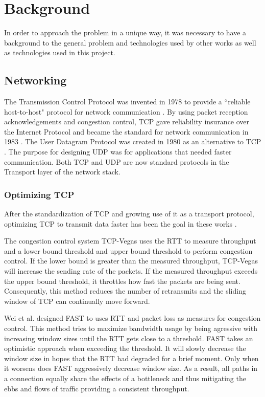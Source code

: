 \chapter{Background}

In order to approach the problem in a unique way, it was necessary to have a background to the general problem and technologies used by other works as well as technologies used in this project.

\section{Networking}

The Transmission Control Protocol was invented in 1978 to provide a ``reliable host-to-host" protocol for network communication \cite{cerf1978specification}. By using packet reception acknowledgements and congestion control, TCP gave reliability insurance over the Internet Protocol and became the standard for network communication in 1983 \cite{andrews2013who}. The User Datagram Protocol was created in 1980 as an alternative to TCP \cite{postel1980user}\cite{kozierokr2005udp}. The purpose for designing UDP was for applications that needed faster communication. Both TCP and UDP are now standard protocols in the Transport layer of the network stack.

\subsection{Optimizing TCP}

After the standardization of TCP and growing use of it as a transport protocol, optimizing TCP to transmit data faster has been the goal in these works \cite{brakmo1995tcp}\cite{wei2006fast}\cite{ha2008cubic}. 

The congestion control system TCP-Vegas \cite{brakmo1995tcp} uses the RTT to measure throughput and a lower bound threshold and upper bound threshold to perform congestion control. If the lower bound is greater than the measured throughput, TCP-Vegas will increase the sending rate of the packets. If the measured throughput exceeds the upper bound threshold, it throttles how fast the packets are being sent. Consequently, this method reduces the number of retransmits and the sliding window of TCP can continually move forward.

Wei et al. designed FAST to uses RTT and packet loss as measures for congestion control. This method tries to maximize bandwidth usage by being agressive with increasing window sizes until the RTT gets close to a threshold. FAST takes an optimistic approach when exceeding the threshold. It will slowly decrease the window size in hopes that the RTT had degraded for a brief moment. Only when it worsens does FAST aggressively decrease window size. As a result, all paths in a connection equally share the effects of a bottleneck and thus mitigating the ebbs and flows of traffic providing a consistent throughput.

